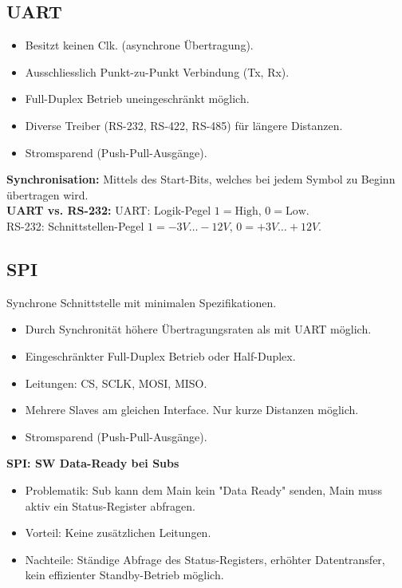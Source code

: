 \subsection{UART}
\begin{itemize}
    \item Besitzt keinen Clk. (asynchrone Übertragung).
    \item Ausschliesslich Punkt-zu-Punkt Verbindung (Tx, Rx).
    \item Full-Duplex Betrieb uneingeschränkt möglich.
    \item Diverse Treiber (RS-232, RS-422, RS-485) für längere Distanzen.
    \item Stromsparend (Push-Pull-Ausgänge).
\end{itemize}
\textbf{Synchronisation:} Mittels des Start-Bits, welches bei jedem Symbol zu Beginn übertragen wird.\\
\textbf{UART vs. RS-232:}
UART: Logik-Pegel $1=\text{High}$, $0=\text{Low}$. \\
RS-232: Schnittstellen-Pegel $1=-3V \dots -12V$, $0=+3V \dots +12V$.

\subsection{SPI}
Synchrone Schnittstelle mit minimalen Spezifikationen.
\begin{itemize}
    \item Durch Synchronität höhere Übertragungsraten als mit UART möglich.
    \item Eingeschränkter Full-Duplex Betrieb oder Half-Duplex.
    \item Leitungen: CS, SCLK, MOSI, MISO.
    \item Mehrere Slaves am gleichen Interface. Nur kurze Distanzen möglich.
    \item Stromsparend (Push-Pull-Ausgänge).
\end{itemize}

\textbf{SPI: SW Data-Ready bei Subs}
\begin{itemize}
    \item Problematik: Sub kann dem Main kein "Data Ready" senden, Main muss aktiv ein Status-Register abfragen.
    \item Vorteil: Keine zusätzlichen Leitungen.
    \item Nachteile: Ständige Abfrage des Status-Registers, erhöhter Datentransfer, kein effizienter Standby-Betrieb möglich.
\end{itemize}

